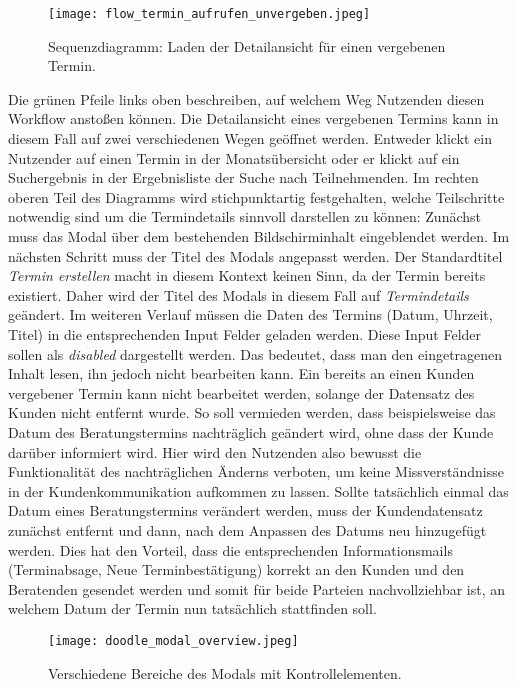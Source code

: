 \begin{figure}[H]
    \caption{Sequenzdiagramm: Laden der Detailansicht für einen vergebenen Termin.}
    \centering
    \texttt{[image: flow\_termin\_aufrufen\_unvergeben.jpeg]}
\end{figure}

Die grünen Pfeile links oben beschreiben, auf welchem Weg Nutzenden diesen
Workflow anstoßen können. Die Detailansicht eines vergebenen Termins kann in
diesem Fall auf zwei verschiedenen Wegen geöffnet werden. Entweder klickt ein
Nutzender auf einen Termin in der Monatsübersicht oder er klickt auf ein
Suchergebnis in der Ergebnisliste der Suche nach Teilnehmenden. Im rechten
oberen Teil des Diagramms wird stichpunktartig festgehalten, welche
Teilschritte notwendig sind um die Termindetails sinnvoll darstellen zu können:
Zunächst muss das \gls{Modal} über dem bestehenden Bildschirminhalt
eingeblendet werden. Im nächsten Schritt muss der Titel des Modals angepasst
werden. Der Standardtitel \textit{Termin erstellen} macht in diesem Kontext
keinen Sinn, da der Termin bereits existiert. Daher wird der Titel des Modals
in diesem Fall auf \textit{Termindetails} geändert. Im weiteren Verlauf müssen
die Daten des Termins (Datum, Uhrzeit, Titel) in die entsprechenden Input
Felder geladen werden. Diese Input Felder sollen als \textit{disabled}
dargestellt werden. Das bedeutet, dass man den eingetragenen Inhalt lesen, ihn
jedoch nicht bearbeiten kann. Ein bereits an einen Kunden vergebener Termin
kann nicht bearbeitet werden, solange der Datensatz des Kunden nicht entfernt
wurde. So soll vermieden werden, dass beispielsweise das Datum des
Beratungstermins nachträglich geändert wird, ohne dass der Kunde darüber
informiert wird. Hier wird den Nutzenden also bewusst die Funktionalität des
nachträglichen Änderns verboten, um keine Missverständnisse in der
Kundenkommunikation aufkommen zu lassen. Sollte tatsächlich einmal das Datum
eines Beratungstermins verändert werden, muss der Kundendatensatz zunächst
entfernt und dann, nach dem Anpassen des Datums neu hinzugefügt werden. Dies
hat den Vorteil, dass die entsprechenden Informationsmails (Terminabsage, Neue
Terminbestätigung) korrekt an den Kunden und den Beratenden gesendet werden und
somit für beide Parteien nachvollziehbar ist, an welchem Datum der Termin nun
tatsächlich stattfinden soll.

\begin{figure}[H]
    \caption{Verschiedene Bereiche des Modals mit Kontrollelementen.}
    \centering
    \texttt{[image: doodle\_modal\_overview.jpeg]}
\end{figure}

